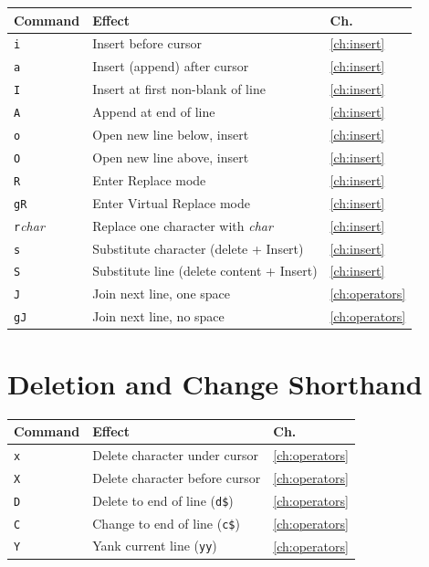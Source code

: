 \begin{longtable}{@{}l p{9cm} l@{}}
\textbf{Command} & \textbf{Effect} & \textbf{Ch.} \\
\hline
\endhead
\texttt{i} & Insert before cursor & \ref{ch:insert} \\
\texttt{a} & Insert (append) after cursor & \ref{ch:insert} \\
\texttt{I} & Insert at first non-blank of line & \ref{ch:insert} \\
\texttt{A} & Append at end of line & \ref{ch:insert} \\
\texttt{o} & Open new line below, insert & \ref{ch:insert} \\
\texttt{O} & Open new line above, insert & \ref{ch:insert} \\
\texttt{R} & Enter Replace mode & \ref{ch:insert} \\
\texttt{gR} & Enter Virtual Replace mode & \ref{ch:insert} \\
\texttt{r}\textit{char} & Replace one character with \textit{char} & \ref{ch:insert} \\
\texttt{s} & Substitute character (delete + Insert) & \ref{ch:insert} \\
\texttt{S} & Substitute line (delete content + Insert) & \ref{ch:insert} \\
\texttt{J} & Join next line, one space & \ref{ch:operators} \\
\texttt{gJ} & Join next line, no space & \ref{ch:operators} \\
\end{longtable}

\section{Deletion and Change Shorthand}

\begin{longtable}{@{}l p{9cm} l@{}}
\textbf{Command} & \textbf{Effect} & \textbf{Ch.} \\
\hline
\endhead
\texttt{x} & Delete character under cursor & \ref{ch:operators} \\
\texttt{X} & Delete character before cursor & \ref{ch:operators} \\
\texttt{D} & Delete to end of line (\texttt{d\$}) & \ref{ch:operators} \\
\texttt{C} & Change to end of line (\texttt{c\$}) & \ref{ch:operators} \\
\texttt{Y} & Yank current line (\texttt{yy}) & \ref{ch:operators} \\
\end{longtable}

